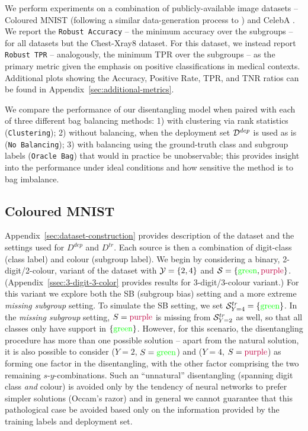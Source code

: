 We perform experiments on a combination of publicly-available image datasets -- Coloured MNIST
(following a similar data-generation process to \citet{KehBarThoQua20}) and CelebA
\citep{liu2015celeba}.
%
We report the \texttt{Robust Accuracy} -- the minimum accuracy over the subgroups -- for all
datasets but the Chest-Xray8 dataset. 
%
For this dataset, we instead report \texttt{Robust TPR} -- analogously, the minimum \ac{TPR} over the
subgroups -- as the primary metric given the emphasis on positive classifications in medical
contexts. 
%
Additional plots showing the Accuracy, Positive Rate, \ac{TPR}, and \ac{TNR} ratios can be found in
Appendix~\ref{sec:additional-metrics}.

We compare the performance of our disentangling model when paired with each of three different bag
balancing methods: 1) with clustering via rank statistics (\texttt{Clustering}); 2) without
balancing, when the deployment set ${\mathcal{D}}^{dep}$ is used as is (\texttt{No Balancing}); 3) with
balancing using the ground-truth class and subgroup labels (\texttt{Oracle Bag}) that would in
practice be unobservable; this provides insight into the performance under ideal conditions and how
sensitive the method is to bag imbalance.
 
\subsection{Coloured MNIST}\label{ssec:cmnist_exp}
%

%
Appendix~\ref{sec:dataset-construction} provides description of the dataset and the settings used
for \( D^{dep} \) and \( D^{tr} \). 
%
Each source is then a combination of digit-class (class label) and colour (subgroup label). 
%
We begin by considering a binary, 2-digit/2-colour, variant of the dataset with ${\mathcal{Y}} = \{2, 4\}$
and ${\mathcal{S}} = \{\text{\color{green}green}, \text{\color{purple}purple}\}$.
(Appendix~\ref{ssec:3-digit-3-color} provides results for 3-digit/3-colour variant.) 
%
For this variant we explore both the SB (subgroup bias) setting and a more extreme \emph{missing
subgroup} setting.
%
To simulate the SB setting, we set \({\mathcal{S}}^{tr}_{ Y=4 }=\{\text{\color{green}{green}}\}\). 
%
In the \emph{missing subgroup} setting, $S=\text{\color{purple}{purple}}$ is missing from
\({\mathcal{S}}^{tr}_{ Y=2 }\) as well, so that all classes only have support in
\(\{\text{\color{green}{green}}\}\).
%
However, for this scenario, the disentangling procedure has more than one possible solution --
apart from the natural solution, it is also possible to consider ($Y=2$,
$S=\text{\color{green}{green}}$) and ($Y=4$, $S=\text{\color{purple}{purple}}$) as forming one
factor in the disentangling, with the other factor comprising the two remaining
$s$-$y$-combinations.
%
Such an ``unnatural'' disentangling (spanning digit class \emph{and} colour) is avoided only by the
tendency of neural networks to prefer simpler solutions (Occam's razor) and in general we cannot
guarantee that this pathological case be avoided based only on the information provided by the
training labels and deployment set.

